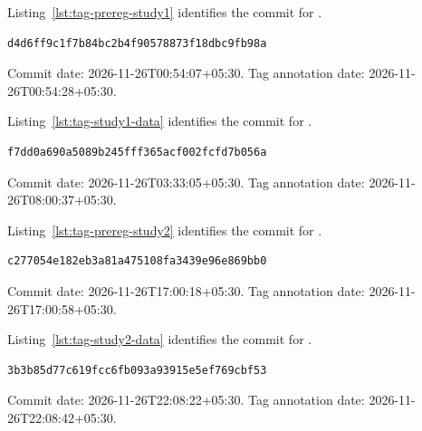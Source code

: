 Listing~\ref{lst:tag-prereg-study1} identifies the commit for .
\begin{lstlisting}[caption={prereg-study1 commit.},label={lst:tag-prereg-study1}]
d4d6ff9c1f7b84bc2b4f90578873f18dbc9fb98a
\end{lstlisting}
Commit date: 2026-11-26T00:54:07+05:30. Tag annotation date: 2026-11-26T00:54:28+05:30.

Listing~\ref{lst:tag-study1-data} identifies the commit for .
\begin{lstlisting}[caption={study1-data commit.},label={lst:tag-study1-data}]
f7dd0a690a5089b245fff365acf002fcfd7b056a
\end{lstlisting}
Commit date: 2026-11-26T03:33:05+05:30. Tag annotation date: 2026-11-26T08:00:37+05:30.

Listing~\ref{lst:tag-prereg-study2} identifies the commit for .
\begin{lstlisting}[caption={prereg-study2 commit.},label={lst:tag-prereg-study2}]
c277054e182eb3a81a475108fa3439e96e869bb0
\end{lstlisting}
Commit date: 2026-11-26T17:00:18+05:30. Tag annotation date: 2026-11-26T17:00:58+05:30.

Listing~\ref{lst:tag-study2-data} identifies the commit for .
\begin{lstlisting}[caption={study2-data commit.},label={lst:tag-study2-data}]
3b3b85d77c619fcc6fb093a93915e5ef769cbf53
\end{lstlisting}
Commit date: 2026-11-26T22:08:22+05:30. Tag annotation date: 2026-11-26T22:08:42+05:30.

